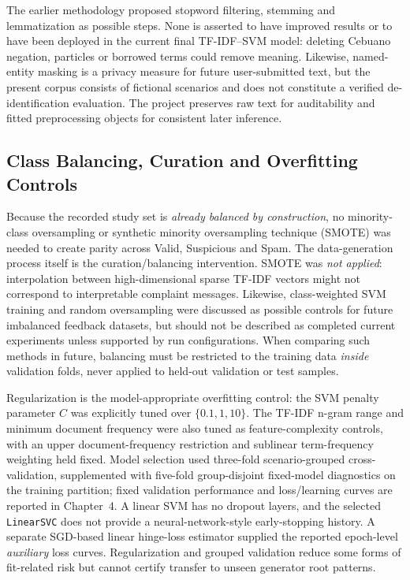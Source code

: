 The earlier methodology proposed stopword filtering, stemming and lemmatization as possible steps. None is asserted to have improved results or to have been deployed in the current final TF-IDF--SVM model: deleting Cebuano negation, particles or borrowed terms could remove meaning. Likewise, named-entity masking is a privacy measure for future user-submitted text, but the present corpus consists of fictional scenarios and does not constitute a verified de-identification evaluation. The project preserves raw text for auditability and fitted preprocessing objects for consistent later inference.
\subsection{Class Balancing, Curation and Overfitting Controls}
Because the recorded study set is \emph{already balanced by construction}, no minority-class oversampling or synthetic minority oversampling technique (SMOTE) was needed to create parity across Valid, Suspicious and Spam. The data-generation process itself is the curation/balancing intervention. SMOTE was \emph{not applied}: interpolation between high-dimensional sparse TF-IDF vectors might not correspond to interpretable complaint messages. Likewise, class-weighted SVM training and random oversampling were discussed as possible controls for future imbalanced feedback datasets, but should not be described as completed current experiments unless supported by run configurations. When comparing such methods in future, balancing must be restricted to the training data \emph{inside} validation folds, never applied to held-out validation or test samples.

Regularization is the model-appropriate overfitting control: the SVM penalty parameter $C$ was explicitly tuned over $\{0.1,1,10\}$. The TF-IDF n-gram range and minimum document frequency were also tuned as feature-complexity controls, with an upper document-frequency restriction and sublinear term-frequency weighting held fixed. Model selection used three-fold scenario-grouped cross-validation, supplemented with five-fold group-disjoint fixed-model diagnostics on the training partition; fixed validation performance and loss/learning curves are reported in Chapter~4. A linear SVM has no dropout layers, and the selected \texttt{LinearSVC} does not provide a neural-network-style early-stopping history. A separate SGD-based linear hinge-loss estimator supplied the reported epoch-level \emph{auxiliary} loss curves. Regularization and grouped validation reduce some forms of fit-related risk but cannot certify transfer to unseen generator root patterns.
